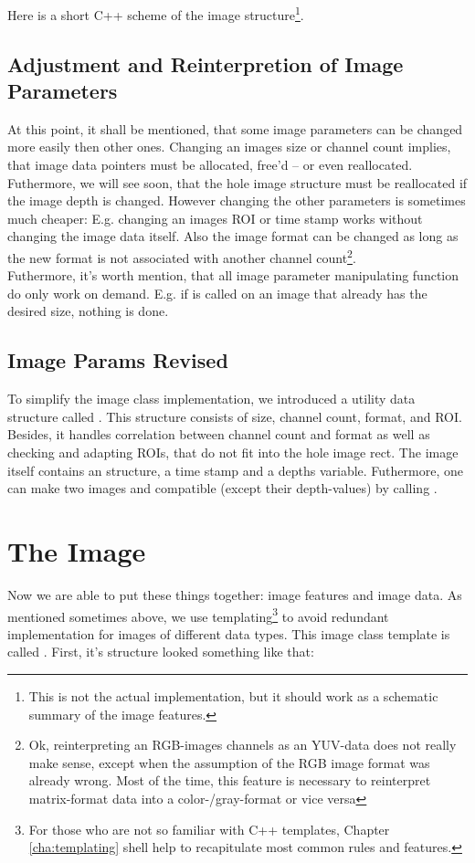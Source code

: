 Here is a short C++ scheme of the image structure\footnote{This is not the actual implementation, but it should work as a schematic summary of the image features.}.



\subsection {Adjustment and Reinterpretion of Image Parameters}
At this point, it shall be mentioned, that some image parameters can be changed more easily then other ones. Changing an images size or channel count implies, that image data pointers must be allocated, free'd -- or even reallocated. Futhermore, we will see soon, that the hole image structure must be reallocated if the image depth is changed. However changing the other parameters is sometimes much cheaper: E.g. changing an images ROI or time stamp works without changing the image data itself. Also the image format can be changed as long as the new format is not associated with another channel count\footnote{Ok, reinterpreting an RGB-images channels as an YUV-data does not really make sense, except when the assumption of the RGB image format was already wrong. Most of the time, this feature is necessary to reinterpret matrix-format data into a color-/gray-format or vice versa}.\\
Futhermore, it's worth mention, that all image parameter manipulating function do only work on demand. E.g. if  is called on an image that already has the desired size, nothing is done.


\subsection {Image Params Revised}
To simplify the image class implementation, we introduced a utility data structure called  . This structure consists of size, channel count, format, and ROI. Besides, it handles correlation between channel count and format as well as checking and adapting ROIs, that do not fit into the hole image rect. The image itself contains an  structure, a time stamp and a depths variable. Futhermore, one can make two images  and  compatible (except their depth-values) by calling .


\section{The Image}
Now we are able to put these things together: image features and image data. As mentioned sometimes above, we use templating\footnote{For those who are not so familiar with C++ templates, Chapter \ref{cha:templating} shell help to recapitulate most common rules and features.} to avoid redundant implementation for images of different data types. This image class template is called  . First, it's structure looked something like that:

